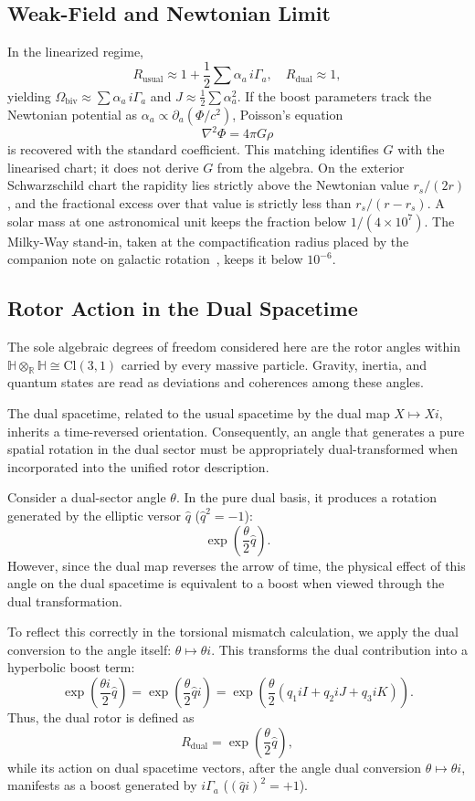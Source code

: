 \documentclass[a4paper]{article}
\begin{document}
\subsection{Weak-Field and Newtonian Limit}

In the linearized regime,
\[
R_\text{usual} \approx 1 + \frac{1}{2} \sum \alpha_a \, i\Gamma_a, \quad R_\text{dual} \approx 1,
\]
yielding $\Omega_\text{biv} \approx \sum \alpha_a \, i\Gamma_a$ and $J \approx \frac{1}{2} \sum \alpha_a^2$. If the boost parameters track the Newtonian potential as $\alpha_a \propto \partial_a (\Phi/c^2)$, Poisson's equation
\[
\nabla^2 \Phi = 4\pi G \rho
\]
is recovered with the standard coefficient. This matching identifies $G$ with the linearised chart; it does not derive $G$ from the algebra. On the exterior Schwarzschild chart the rapidity lies strictly above the Newtonian value $r_s/(2r)$, and the fractional excess over that value is strictly less than $r_s/(r-r_s)$. A solar mass at one astronomical unit keeps the fraction below $1/(4\times 10^7)$. The Milky-Way stand-in, taken at the compactification radius placed by the companion note on galactic rotation~\cite{dst-galactic}, keeps it below $10^{-6}$.

\subsection{Rotor Action in the Dual Spacetime}
\label{subsec:dual-rotors}

The sole algebraic degrees of freedom considered here are the rotor angles within $\mathbb{H} \otimes_{\mathbb{R}} \mathbb{H} \cong \mathrm{Cl}(3,1)$ carried by every massive particle. Gravity, inertia, and quantum states are read as deviations and coherences among these angles.

The dual spacetime, related to the usual spacetime by the dual map $X \mapsto Xi$, inherits a time-reversed orientation. Consequently, an angle that generates a pure spatial rotation in the dual sector must be appropriately dual-transformed when incorporated into the unified rotor description.

Consider a dual-sector angle $\theta$. In the pure dual basis, it produces a rotation generated by the elliptic versor $\hat{q}$ ($\hat{q}^2 = -1$):
\[
\exp\left( \frac{\theta}{2} \hat{q} \right).
\]
However, since the dual map reverses the arrow of time, the physical effect of this angle on the dual spacetime is equivalent to a boost when viewed through the dual transformation.

To reflect this correctly in the torsional mismatch calculation, we apply the dual conversion to the angle itself: $\theta \mapsto \theta i$. This transforms the dual contribution into a hyperbolic boost term:
\[
\exp\left( \frac{\theta i}{2} \hat{q} \right) = \exp\left( \frac{\theta}{2} \hat{q}i \right) = \exp\left( \frac{\theta}{2} (q_1 iI + q_2 iJ + q_3 iK) \right).
\]
Thus, the dual rotor is defined as
\[
R_\text{dual} = \exp\left( \frac{\theta}{2} \hat{q} \right),
\]
while its action on dual spacetime vectors, after the angle dual conversion $\theta \mapsto \theta i$, manifests as a boost generated by $i\Gamma_a$ ($ (\hat{q}i)^2 = +1 $).
\end{document}
